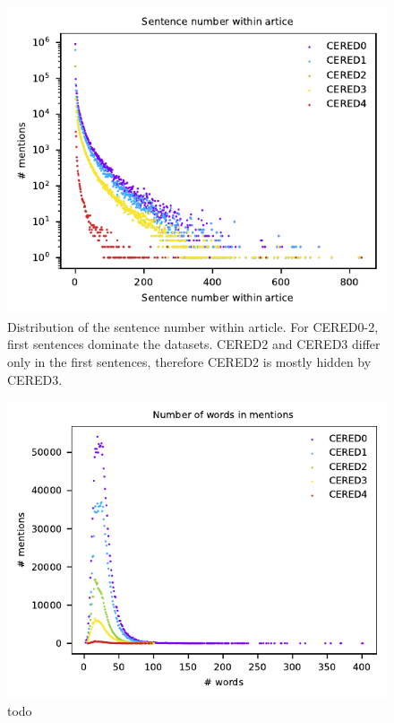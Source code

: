 \begin{figure}[h]\centering
\includegraphics[scale=1.2]{./img/firstsentence0-4_valid}
\caption{Distribution of the sentence number within article. For CERED0-2, first sentences dominate the datasets. CERED2 and CERED3 differ only in the first sentences, therefore CERED2 is mostly hidden by CERED3.}
\label{obr:firstsentences}
\end{figure}

\begin{figure}[h]\centering
\includegraphics[scale=1.2]{./img/Words0-4_valid}
\caption{todo}
\label{obr:wordsinsentences}
\end{figure}


